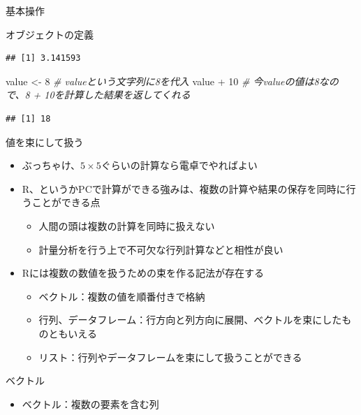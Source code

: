 \documentclass[
  ignorenonframetext,
]{beamer}
\newenvironment{Shaded}{\begin{snugshade}}{\end{snugshade}}
\newcommand{\CommentTok}[1]{\textcolor[rgb]{0.56,0.35,0.01}{\textit{#1}}}
\newcommand{\DecValTok}[1]{\textcolor[rgb]{0.00,0.00,0.81}{#1}}
\newcommand{\NormalTok}[1]{#1}
\newcommand{\OtherTok}[1]{\textcolor[rgb]{0.56,0.35,0.01}{#1}}
\newcommand{\SpecialCharTok}[1]{\textcolor[rgb]{0.00,0.00,0.00}{#1}}
\providecommand{\tightlist}{%
  \setlength{\itemsep}{0pt}\setlength{\parskip}{0pt}}
\begin{document}
\begin{frame}[fragile]{基本操作}
\begin{block}{オブジェクトの定義}
\begin{verbatim}
## [1] 3.141593
\end{verbatim}

\begin{Shaded}
\begin{Highlighting}[]
\NormalTok{value }\OtherTok{\textless{}{-}} \DecValTok{8} \CommentTok{\# valueという文字列に8を代入}
\NormalTok{value }\SpecialCharTok{+} \DecValTok{10} \CommentTok{\# 今valueの値は8なので、8 + 10を計算した結果を返してくれる}
\end{Highlighting}
\end{Shaded}

\begin{verbatim}
## [1] 18
\end{verbatim}
\end{block}

\begin{block}{値を束にして扱う}
\protect\hypertarget{ux5024ux3092ux675fux306bux3057ux3066ux6271ux3046}{}
\begin{itemize}
\tightlist
\item
  ぶっちゃけ、\(5 \times 5\)ぐらいの計算なら電卓でやればよい
\item
  R、というかPCで計算ができる強みは、複数の計算や結果の保存を同時に行うことができる点

  \begin{itemize}
  \tightlist
  \item
    人間の頭は複数の計算を同時に扱えない
  \item
    計量分析を行う上で不可欠な行列計算などと相性が良い
  \end{itemize}
\item
  Rには複数の数値を扱うための束を作る記法が存在する

  \begin{itemize}
  \tightlist
  \item
    ベクトル：複数の値を順番付きで格納
  \item
    行列、データフレーム：行方向と列方向に展開、ベクトルを束にしたものともいえる
  \item
    リスト：行列やデータフレームを束にして扱うことができる
  \end{itemize}
\end{itemize}
\end{block}

\begin{block}{ベクトル}
\protect\hypertarget{ux30d9ux30afux30c8ux30eb}{}
\begin{itemize}
\tightlist
\item
  ベクトル：複数の要素を含む列


\end{itemize}
\end{block}
\end{frame}
\end{document}
